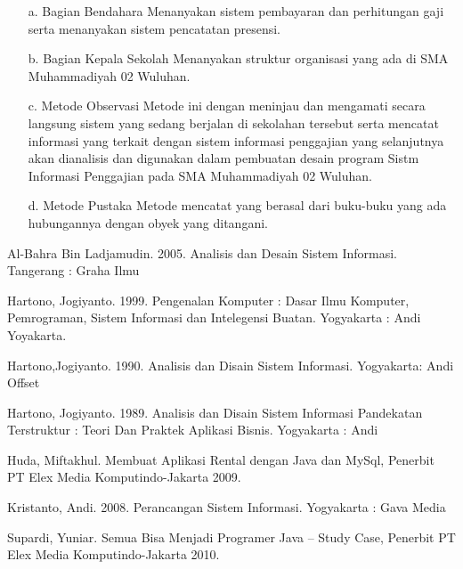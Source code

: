 \documentclass{jtetiproposalskripsi}
\begin{document}
\begin{itemize}


\item[a.]	Bagian Bendahara
Menanyakan sistem pembayaran dan perhitungan gaji serta menanyakan sistem pencatatan presensi.

\item[b.]	Bagian Kepala Sekolah
Menanyakan struktur organisasi yang ada di SMA Muhammadiyah 02 Wuluhan.

\item[c.]	Metode Observasi
Metode ini dengan meninjau dan mengamati secara langsung sistem yang sedang berjalan di sekolahan tersebut serta mencatat informasi yang terkait dengan sistem informasi penggajian yang selanjutnya akan dianalisis dan digunakan dalam pembuatan desain program Sistm Informasi Penggajian pada SMA Muhammadiyah 02 Wuluhan.

\item[d.]	Metode Pustaka
Metode mencatat yang berasal dari buku-buku yang ada hubungannya dengan obyek yang ditangani.
\end{itemize}

\begin{thebibliography}{9}

Al-Bahra Bin Ladjamudin. 2005. Analisis dan Desain Sistem Informasi. Tangerang : Graha Ilmu

Hartono, Jogiyanto. 1999. Pengenalan Komputer : Dasar Ilmu Komputer, Pemrograman, Sistem Informasi dan Intelegensi Buatan. Yogyakarta : Andi Yoyakarta.

Hartono,Jogiyanto. 1990. Analisis dan Disain Sistem Informasi. Yogyakarta: Andi Offset

Hartono, Jogiyanto. 1989. Analisis dan Disain Sistem Informasi Pandekatan Terstruktur : Teori Dan Praktek Aplikasi Bisnis. Yogyakarta : Andi

Huda, Miftakhul. Membuat Aplikasi Rental dengan Java dan MySql, Penerbit PT Elex Media Komputindo-Jakarta 2009.

Kristanto, Andi. 2008. Perancangan Sistem Informasi. Yogyakarta : Gava Media

Supardi, Yuniar. Semua Bisa Menjadi Programer Java – Study Case, Penerbit PT Elex Media Komputindo-Jakarta 2010.


\end{thebibliography}
\end{document}
